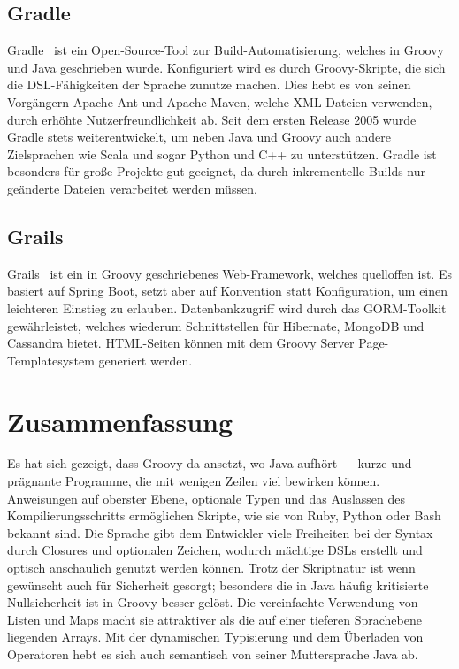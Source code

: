 \documentclass[a4paper]{article}
\begin{document}
\subsection{Gradle}\label{subsec:gradle}

Gradle~\cite{gradle} ist ein Open-Source-Tool zur Build-Automatisierung, welches in Groovy und Java geschrieben wurde.
Konfiguriert wird es durch Groovy-Skripte, die sich die DSL-Fähigkeiten der Sprache zunutze machen.
Dies hebt es von seinen Vorgängern Apache Ant und Apache Maven, welche XML-Dateien verwenden, durch erhöhte Nutzerfreundlichkeit ab.
Seit dem ersten Release 2005 wurde Gradle stets weiterentwickelt, um neben Java und Groovy auch andere Zielsprachen wie Scala und sogar Python und C++ zu unterstützen.
Gradle ist besonders für große Projekte gut geeignet, da durch inkrementelle Builds nur geänderte Dateien verarbeitet werden müssen.

\subsection{Grails}\label{subsec:grails}

Grails~\cite{grails} ist ein in Groovy geschriebenes Web-Framework, welches quelloffen ist.
Es basiert auf Spring Boot, setzt aber auf Konvention statt Konfiguration, um einen leichteren Einstieg zu erlauben.
Datenbankzugriff wird durch das GORM-Toolkit gewährleistet, welches wiederum Schnittstellen für Hibernate, MongoDB und Cassandra bietet.
HTML-Seiten können mit dem Groovy Server Page-Templatesystem generiert werden.


\section{Zusammenfassung}\label{sec:zusammenfassung}

Es hat sich gezeigt, dass Groovy da ansetzt, wo Java aufhört --- kurze und prägnante Programme, die mit wenigen Zeilen viel bewirken können.
Anweisungen auf oberster Ebene, optionale Typen und das Auslassen des Kompilierungsschritts ermöglichen Skripte, wie sie von Ruby, Python oder Bash bekannt sind.
Die Sprache gibt dem Entwickler viele Freiheiten bei der Syntax durch Closures und optionalen Zeichen, wodurch mächtige DSLs erstellt und optisch anschaulich genutzt werden können.
Trotz der Skriptnatur ist wenn gewünscht auch für Sicherheit gesorgt;
besonders die in Java häufig kritisierte Nullsicherheit ist in Groovy besser gelöst.
Die vereinfachte Verwendung von Listen und Maps macht sie attraktiver als die auf einer tieferen Sprachebene liegenden Arrays.
Mit der dynamischen Typisierung und dem Überladen von Operatoren hebt es sich auch semantisch von seiner Muttersprache Java ab.
\end{document}
